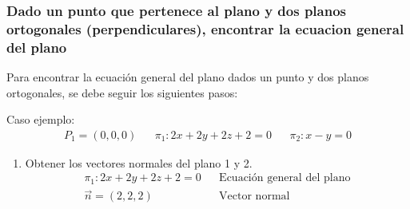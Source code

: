 \documentclass{templateNote}
\begin{document}
\subsubsection{Dado un punto que pertenece al plano y dos planos ortogonales (perpendiculares), encontrar la ecuacion general del plano}
\indent
Para encontrar la ecuación general del plano dados un punto y dos planos ortogonales, se debe seguir los siguientes pasos:

Caso ejemplo:
\begin{align*}
    P_1 = (0, 0, 0) &&
    \pi_1: 2x + 2y + 2z + 2 = 0 &&
    \pi_2: x - y = 0
\end{align*}

\begin{enumerate}
    \item Obtener los vectores normales del plano 1 y 2.
    \begin{align*}
        \pi_1: 2x + 2y + 2z + 2 = 0 && \text{Ecuación general del plano} \\
        \overrightarrow{n} = (2, 2, 2) && \text{Vector normal}
    \end{align*}
    

\end{enumerate}
\end{document}
